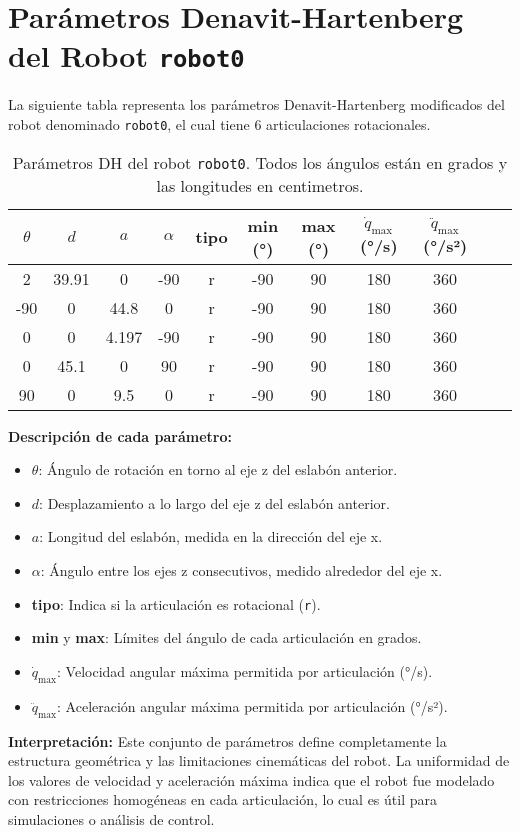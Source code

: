 	
	\section*{Parámetros Denavit-Hartenberg del Robot \texttt{robot0}}
	
	La siguiente tabla representa los parámetros Denavit-Hartenberg modificados del robot denominado \texttt{robot0}, el cual tiene 6 articulaciones rotacionales.
	
	\begin{table}[h!]
		\centering
		\begin{tabular}{ccccccccccc}
			\toprule
			\textbf{$\theta$} & \textbf{$d$} & \textbf{$a$} & \textbf{$\alpha$} & \textbf{tipo} & \textbf{min (°)} & \textbf{max (°)} & \textbf{$\dot{q}_{\text{max}}$ (°/s)} & \textbf{$\ddot{q}_{\text{max}}$ (°/s²)} \\
			\midrule
			2   & 39.91 & 0     & -90 & r & -90 & 90 & 180 & 360 \\
			-90 & 0     & 44.8  & 0   & r & -90 & 90 & 180 & 360 \\
			0   & 0     & 4.197 & -90 & r & -90 & 90 & 180 & 360 \\
			0   & 45.1  & 0     & 90  & r & -90 & 90 & 180 & 360 \\
			90  & 0     & 9.5   & 0   & r & -90 & 90 & 180 & 360 \\
			\bottomrule
		\end{tabular}
		\caption{Parámetros DH del robot \texttt{robot0}. Todos los ángulos están en grados y las longitudes en centimetros.}
	\end{table}
	
	\textbf{Descripción de cada parámetro:}
	\begin{itemize}
		\item $\theta$: Ángulo de rotación en torno al eje z del eslabón anterior.
		\item $d$: Desplazamiento a lo largo del eje z del eslabón anterior.
		\item $a$: Longitud del eslabón, medida en la dirección del eje x.
		\item $\alpha$: Ángulo entre los ejes z consecutivos, medido alrededor del eje x.
		\item \textbf{tipo}: Indica si la articulación es rotacional (\texttt{r}).
		\item \textbf{min} y \textbf{max}: Límites del ángulo de cada articulación en grados.
		\item $\dot{q}_{\text{max}}$: Velocidad angular máxima permitida por articulación (°/s).
		\item $\ddot{q}_{\text{max}}$: Aceleración angular máxima permitida por articulación (°/s²).
	\end{itemize}
	
	\textbf{Interpretación:}  
	Este conjunto de parámetros define completamente la estructura geométrica y las limitaciones cinemáticas del robot. La uniformidad de los valores de velocidad y aceleración máxima indica que el robot fue modelado con restricciones homogéneas en cada articulación, lo cual es útil para simulaciones o análisis de control.
	


